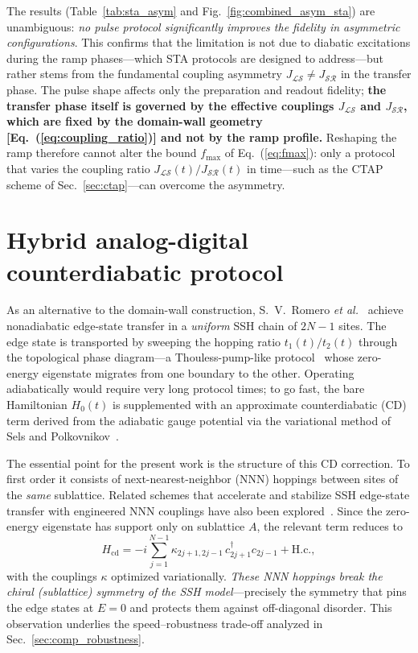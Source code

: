 \documentclass[
  reprint,
  amsmath,
  amssymb,
  aps,
  prb,
  floatfix,
  longbibliography,
]{revtex4-2}
\newcommand{\JLS}{J_{\mathcal{LS}}}
\newcommand{\JSR}{J_{\mathcal{SR}}}
\begin{document}
The results (Table~\ref{tab:sta_asym} and Fig.~\ref{fig:combined_asym_sta})
are unambiguous: \emph{no pulse protocol significantly improves the fidelity in
asymmetric configurations}. This confirms that the limitation is not due to
diabatic excitations during the ramp phases---which STA protocols are designed
to address---but rather stems from the fundamental coupling asymmetry
$\JLS \neq \JSR$ in the transfer phase. The pulse shape affects only the
preparation and readout fidelity; \textbf{the transfer phase itself is governed
by the effective couplings $\JLS$ and $\JSR$, which are fixed by the domain-wall
geometry [Eq.~(\ref{eq:coupling_ratio})] and not by the ramp profile.} Reshaping
the ramp therefore cannot alter the bound $f_{\max}$ of Eq.~(\ref{eq:fmax}): only
a protocol that varies the coupling ratio $\JLS(t)/\JSR(t)$ in time---such as the
CTAP scheme of Sec.~\ref{sec:ctap}---can overcome the asymmetry.

\section{Hybrid analog-digital counterdiabatic protocol}
\label{sec:cd_protocol}

As an alternative to the domain-wall construction, S.~V.~Romero \textit{et al.}~\cite{Romero2024}
achieve nonadiabatic edge-state transfer in a \emph{uniform} SSH chain of $2N-1$ sites. The edge
state is transported by sweeping the hopping ratio $t_1(t)/t_2(t)$ through the topological phase
diagram---a Thouless-pump-like protocol~\cite{Thouless1983} whose zero-energy eigenstate migrates from one boundary
to the other. Operating adiabatically would require very long protocol times; to go fast, the
bare Hamiltonian $H_0(t)$ is supplemented with an approximate counterdiabatic (CD) term derived
from the adiabatic gauge potential via the variational method of Sels and Polkovnikov~\cite{Sels2017}.

The essential point for the present work is the structure of this CD correction. To first order
it consists of next-nearest-neighbor (NNN) hoppings between sites of the \emph{same} sublattice. Related schemes that accelerate and stabilize SSH edge-state transfer with engineered NNN couplings have also been explored~\cite{DAngelis2020}.
Since the zero-energy eigenstate has support only on sublattice $A$, the relevant term reduces to
\begin{equation}
H_{\mathrm{cd}} = -i\sum_{j=1}^{N-1}\kappa_{2j+1,2j-1}\, c_{2j+1}^\dagger c_{2j-1} + \mathrm{H.c.},
\label{eq:cd_nnn}
\end{equation}
with the couplings $\kappa$ optimized variationally. \emph{These NNN hoppings break the chiral
(sublattice) symmetry of the SSH model}---precisely the symmetry that pins the edge states at
$E=0$ and protects them against off-diagonal disorder. This observation underlies the
speed--robustness trade-off analyzed in Sec.~\ref{sec:comp_robustness}.
\end{document}
